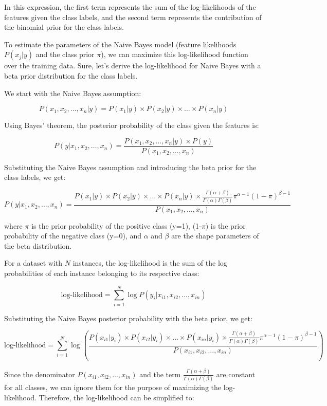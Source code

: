 \documentclass[11pt]{article}
\begin{document}
    In this expression, the first term represents the sum of the log-likelihoods of the features given the class labels, and the second term represents the contribution of the binomial prior for the class labels.

    To estimate the parameters of the Naive Bayes model (feature likelihoods $P(x_j | y)$ and the class prior $\pi$), we can maximize this log-likelihood function over the training data.
    Sure, let's derive the log-likelihood for Naive Bayes with a beta prior distribution for the class labels.

    We start with the Naive Bayes assumption:

    $$P(x_1, x_2, \ldots, x_n | y) = P(x_1 | y) \times P(x_2 | y) \times \ldots \times P(x_n | y)$$

    Using Bayes' theorem, the posterior probability of the class given the features is:

    $$P(y | x_1, x_2, \ldots, x_n) = \frac{P(x_1, x_2, \ldots, x_n | y) \times P(y)}{P(x_1, x_2, \ldots, x_n)}$$

    Substituting the Naive Bayes assumption and introducing the beta prior for the class labels, we get:

    $$P(y | x_1, x_2, \ldots, x_n) = \frac{P(x_1 | y) \times P(x_2 | y) \times \ldots \times P(x_n | y) \times \frac{\Gamma(\alpha + \beta)}{\Gamma(\alpha) \Gamma(\beta)} \pi^{\alpha-1} (1-\pi)^{\beta-1}}{P(x_1, x_2, \ldots, x_n)}$$

    where $\pi$ is the prior probability of the positive class (y=1), (1-$\pi$) is the prior probability of the negative class (y=0), and $\alpha$ and $\beta$ are the shape parameters of the beta distribution.

    For a dataset with $N$ instances, the log-likelihood is the sum of the log probabilities of each instance belonging to its respective class:

    $$\text{log-likelihood} = \sum_{i=1}^{N} \log P(y_i | x_{i1}, x_{i2}, \ldots, x_{in})$$

    Substituting the Naive Bayes posterior probability with the beta prior, we get:

    $$\text{log-likelihood} = \sum_{i=1}^{N} \log \left( \frac{P(x_{i1} | y_i) \times P(x_{i2} | y_i) \times \ldots \times P(x_{in} | y_i) \times \frac{\Gamma(\alpha + \beta)}{\Gamma(\alpha) \Gamma(\beta)} \pi^{\alpha-1} (1-\pi)^{\beta-1}}{P(x_{i1}, x_{i2}, \ldots, x_{in})} \right)$$

    Since the denominator $P(x_{i1}, x_{i2}, \ldots, x_{in})$ and the term $\frac{\Gamma(\alpha + \beta)}{\Gamma(\alpha) \Gamma(\beta)}$ are constant for all classes, we can ignore them for the purpose of maximizing the log-likelihood. Therefore, the log-likelihood can be simplified to:
\end{document}
